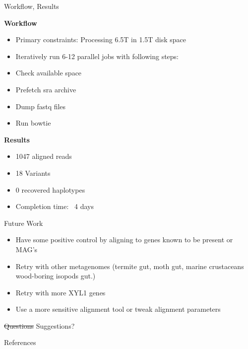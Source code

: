 \documentclass{beamer}
\begin{document}

\begin{frame}{Workflow, Results}
	\item \textbf{Workflow}
 \begin{itemize}
 \item Primary constraints: Processing 6.5T in 1.5T disk space
			\item Iteratively run 6-12 parallel jobs with following steps:
			      
			      	\item Check available space
			      	\item Prefetch sra archive
			      	\item Dump fastq files
			      	\item Run bowtie
			      \end{itemize}
         
    \textbf{Results}
   \begin{itemize}
			      	\item 1047 aligned reads
			      	\item 18 Variants
			      	\item 0 recovered haplotypes
			      	\item Completion time: ~4 days
			    
		\end{itemize}
\end{frame}

\begin{frame}{Future Work}
\begin{itemize}
\item Have some positive control by aligning to genes known to be present or MAG's
\item Retry with other metagenomes (termite gut, moth gut, marine crustaceans wood-boring isopods gut.) 
\item Retry with more XYL1 genes
\item Use a more sensitive alignment tool or tweak alignment parameters
\end{itemize}
\end{frame}

\begin{frame}[focus]
	\sout{Questions} Suggestions?
\end{frame}
    
\appendix
\begin{frame}{References}
	\nocite{*}
	
	
\end{frame}
    
\end{document}
